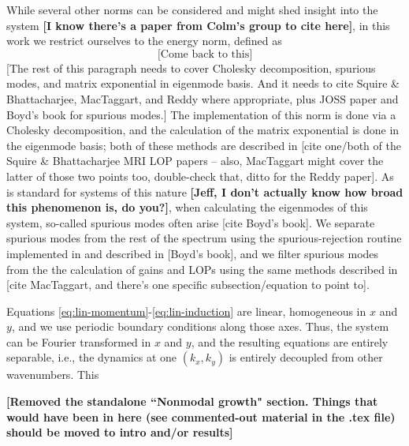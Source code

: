 \documentclass[%
 reprint,
 amsmath,amssymb,
 aps,
]{revtex4-2}
\begin{document}
While several other norms can be considered and might shed insight into the system \textbf{[I know there's a paper from Colm's group to cite here]}, in this work we restrict ourselves to the energy norm, defined as
\begin{equation}
    \text{[Come back to this]}
\end{equation}
[The rest of this paragraph needs to cover Cholesky decomposition, spurious modes, and matrix exponential in eigenmode basis. And it needs to cite Squire \& Bhattacharjee, MacTaggart, and Reddy where appropriate, plus JOSS paper and Boyd's book for spurious modes.] The implementation of this norm is done via a Cholesky decomposition, and the calculation of the matrix exponential is done in the eigenmode basis; both of these methods are described in [cite one/both of the Squire \& Bhattacharjee MRI LOP papers -- also, MacTaggart might cover the latter of those two points too, double-check that, ditto for the Reddy paper]. 
As is standard for systems of this nature \textbf{[Jeff, I don't actually know how broad this phenomenon is, do you?]}, when calculating the eigenmodes of this system, so-called spurious modes often arise [cite Boyd's book]. We separate spurious modes from the rest of the spectrum using the spurious-rejection routine implemented in \cite{2021JOSS....6.3079O} and described in [Boyd's book], and we filter spurious modes from the the calculation of gains and LOPs using the same methods described in [cite MacTaggart, and there's one specific subsection/equation to point to].

Equations \eqref{eq:lin-momentum}-\eqref{eq:lin-induction} are linear, homogeneous in $x$ and $y$, and we use periodic boundary conditions along those axes. Thus, the system can be Fourier transformed in $x$ and $y$, and the resulting equations are entirely separable, i.e., the dynamics at one $(k_x, k_y)$ is entirely decoupled from other wavenumbers. This 


\textbf{[Removed the standalone ``Nonmodal growth" section. Things that would have been in here (see commented-out material in the .tex file) should be moved to intro and/or results]}
\end{document}
